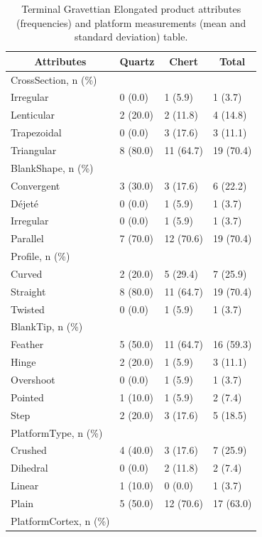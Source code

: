 \documentclass[12pt,twoside]{reedthesis}
\begin{document}
\begin{longtable}[t]{llll}
\caption{\label{tab:unnamed-chunk-78}Terminal Gravettian Elongated product attributes (frequencies) and platform measurements (mean and standard deviation) table.}\\
\toprule
\multicolumn{1}{c}{\textbf{Attributes}} & \multicolumn{1}{c}{\textbf{Quartz}} & \multicolumn{1}{c}{\textbf{Chert}} & \multicolumn{1}{c}{\textbf{Total}}\\
\midrule
CrossSection, n (\%) &  &  & \\
Irregular & 0 (0.0) & 1 (5.9) & 1 \vphantom{1} (3.7)\\
Lenticular & 2 (20.0) & 2 (11.8) & 4 (14.8)\\
Trapezoidal & 0 (0.0) & 3 (17.6) & 3 (11.1)\\
Triangular & 8 (80.0) & 11 (64.7) & 19 (70.4)\\
\addlinespace
BlankShape, n (\%) &  &  & \\
Convergent & 3 (30.0) & 3 (17.6) & 6 (22.2)\\
Déjeté & 0 (0.0) & 1 (5.9) & 1 (3.7)\\
Irregular & 0 (0.0) & 1 (5.9) & 1 (3.7)\\
Parallel & 7 (70.0) & 12 (70.6) & 19 (70.4)\\
\addlinespace
Profile, n (\%) &  &  & \\
Curved & 2 (20.0) & 5 (29.4) & 7 (25.9)\\
Straight & 8 (80.0) & 11 (64.7) & 19 (70.4)\\
Twisted & 0 (0.0) & 1 (5.9) & 1 (3.7)\\
BlankTip, n (\%) &  &  & \\
\addlinespace
Feather & 5 (50.0) & 11 (64.7) & 16 (59.3)\\
Hinge & 2 (20.0) & 1 (5.9) & 3 (11.1)\\
Overshoot & 0 (0.0) & 1 (5.9) & 1 (3.7)\\
Pointed & 1 (10.0) & 1 (5.9) & 2 (7.4)\\
Step & 2 (20.0) & 3 (17.6) & 5 (18.5)\\
\addlinespace
PlatformType, n (\%) &  &  & \\
Crushed & 4 (40.0) & 3 (17.6) & 7 (25.9)\\
Dihedral & 0 (0.0) & 2 (11.8) & 2 (7.4)\\
Linear & 1 (10.0) & 0 (0.0) & 1 (3.7)\\
Plain & 5 (50.0) & 12 (70.6) & 17 (63.0)\\
\addlinespace
PlatformCortex, n (\%) &  &  & \\

\end{longtable}
\end{document}
